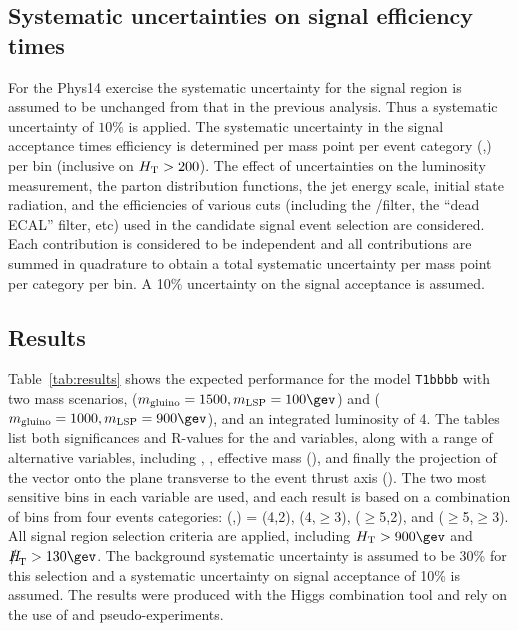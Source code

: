 \subsection{Systematic uncertainties on signal efficiency times}


For the Phys14 exercise the systematic uncertainty for the signal region 
is assumed to be unchanged from that in the previous analysis. 
Thus a systematic uncertainty of $10\%$ is applied. The systematic 
uncertainty in the signal acceptance times efficiency is determined per mass 
point per event category (\njet,\nb) per
\scalht bin (inclusive on $\mbox{$H_\text{T}$} > 200$). The effect of
uncertainties on the luminosity measurement, the parton distribution
functions, the jet energy scale, initial state radiation, and the
efficiencies of various cuts (including the \mht/\met filter, the
``dead ECAL'' filter, etc)
used in the candidate signal event selection are considered. Each
contribution is considered to be independent and all contributions are
summed in quadrature to obtain a total systematic uncertainty per mass
point per category per \scalht bin. A 10\% uncertainty on the signal
acceptance is assumed. 

\newpage

\subsection{Results}

Table~\ref{tab:results} shows
the expected performance for the model \verb!T1bbbb! with two mass
scenarios, ($m_{\rm gluino} = 1500,m_{\rm LSP} = 100\gev$) and
($m_{\rm gluino} = 1000,m_{\rm LSP} = 900\gev$), and an integrated
luminosity of 4\fbinv. The tables list both significances and R-values
for the \scalht and \alphat variables, along with a range of
alternative variables, including \mht, \met, effective mass (\meff),
and finally the projection of the \mht vector onto the plane
transverse to the event thrust axis (\mhttt). The two most sensitive
bins in each variable are used, and each result is based on a
combination of bins from four events categories: (\njet,\nb) = (4,2),
(4,$\geq$3), ($\geq$5,2), and ($\geq$5,$\geq$3). All signal region
selection criteria are applied, including $\scalht > 900\gev$ and
$\mht > 130\gev$. The background systematic uncertainty is assumed to
be 30\% for this selection and a systematic uncertainty on signal
acceptance of 10\% is assumed. The results were produced with the
Higgs combination tool and rely on the use of \cls and
pseudo-experiments.

